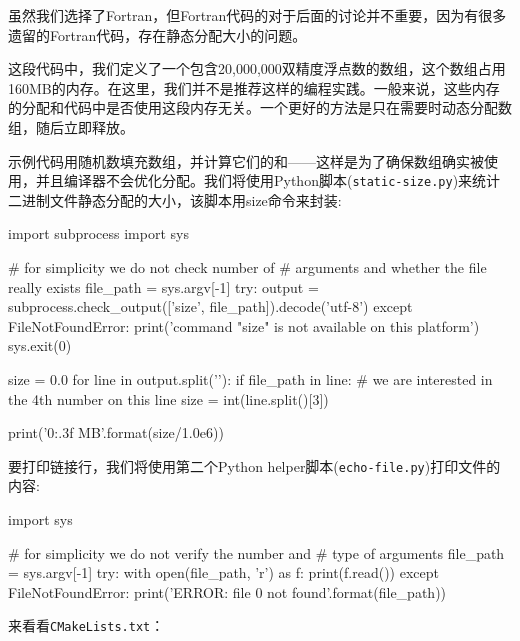 虽然我们选择了Fortran，但Fortran代码的对于后面的讨论并不重要，因为有很多遗留的Fortran代码，存在静态分配大小的问题。

这段代码中，我们定义了一个包含20,000,000双精度浮点数的数组，这个数组占用160MB的内存。在这里，我们并不是推荐这样的编程实践。一般来说，这些内存的分配和代码中是否使用这段内存无关。一个更好的方法是只在需要时动态分配数组，随后立即释放。

示例代码用随机数填充数组，并计算它们的和——这样是为了确保数组确实被使用，并且编译器不会优化分配。我们将使用Python脚本(\texttt{static-size.py})来统计二进制文件静态分配的大小，该脚本用size命令来封装:

\begin{codebox}[python]
import subprocess
import sys

# for simplicity we do not check number of
# arguments and whether the file really exists
file_path = sys.argv[-1]
try:
    output = subprocess.check_output(['size', file_path]).decode('utf-8')
except FileNotFoundError:
    print('command "size" is not available on this platform')
    sys.exit(0)
  
size = 0.0
for line in output.split('\n'):
    if file_path in line:
        # we are interested in the 4th number on this line
        size = int(line.split()[3])
    
print('{0:.3f} MB'.format(size/1.0e6))
\end{codebox}

要打印链接行，我们将使用第二个Python helper脚本(\texttt{echo-file.py})打印文件的内容:

\begin{codebox}[python]
import sys

# for simplicity we do not verify the number and
# type of arguments
file_path = sys.argv[-1]
try:
    with open(file_path, 'r') as f:
print(f.read())
except FileNotFoundError:
    print('ERROR: file {0} not found'.format(file_path))
\end{codebox}


来看看\texttt{CMakeLists.txt}：


